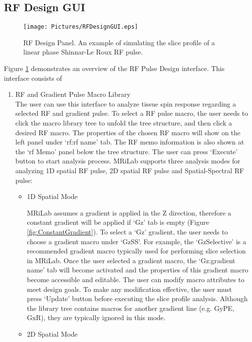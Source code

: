 \documentclass{book}%
\begin{document}
\subsection{RF Design GUI}

\begin{figure}[htbp]
	\centering
		\texttt{[image: Pictures/RFDesignGUI.eps]}
	\caption{RF Design Panel. An example of simulating the slice profile of a linear phase Shinnar-Le Roux RF pulse.}
	\label{fig:RFDesignGUI}
\end{figure}

Figure \ref{fig:RFDesignGUI} demonstrates an overview of the RF Pulse Design interface. This interface consists of 


\begin{enumerate}
	\item RF and Gradient Pulse Macro Library \\

The user can use this interface to analyze tissue spin response regarding a selected RF and gradient pulse. To select a RF pulse macro, the user needs to click the macro library tree to unfold the tree structure, and then click a desired RF macro. The properties of the chosen RF macro will show on the left panel under `rf:rf name' tab. The RF memo information is also shown at the `rf Memo' panel below the tree structure. The user can press `Execute' button to start analysis process. MRiLab supports three analysis modes for analyzing 1D spatial RF pulse, 2D spatial RF pulse and Spatial-Spectral RF pulse:

\begin{itemize}
	\item 1D Spatial Mode
	
MRiLab assumes a gradient is applied in the Z direction, therefore a constant gradient will be applied if `Gz' tab is empty (Figure \ref{fig:ConstantGradient}). To select a `Gz' gradient, the user needs to choose a gradient macro under `GzSS'. For example, the `GzSelective' is a recommended gradient macro typically used for performing slice selection in MRiLab. Once the user selected a gradient macro, the `Gz:gradient name' tab will become activated and the properties of this gradient macro become accessible and editable. The user can modify macro attributes to meet design goals. To make any modification effective, the user must press `Update' button before executing the slice profile analysis. Although the library tree contains macros for another gradient line (e.g. GyPE, GxR), they are typically ignored in this mode.
	\item 2D Spatial Mode


\end{itemize}
\end{enumerate}
\end{document}

